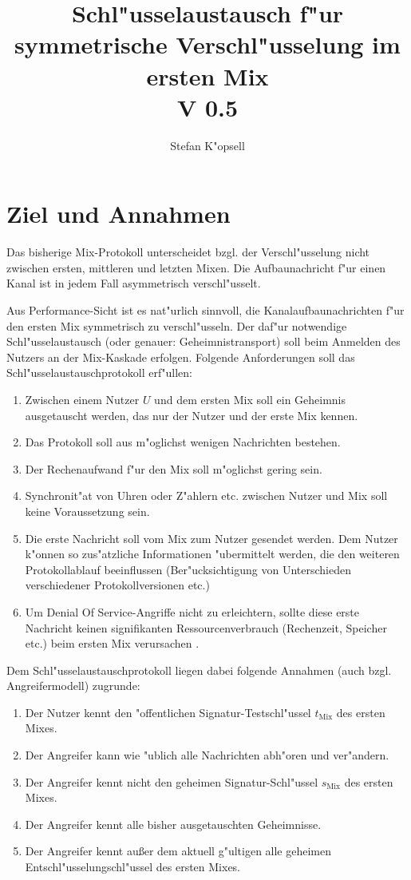 \documentclass[a4paper,german]{article}
\begin{document}
\title{Schl"usselaustausch f"ur symmetrische Verschl"usselung im ersten Mix\\V 0.5}
\author{Stefan K"opsell}
\maketitle
\section{Ziel und Annahmen}
Das bisherige Mix-Protokoll unterscheidet bzgl. der Verschl"usselung nicht zwischen ersten, mittleren und letzten Mixen. Die Aufbaunachricht
f"ur einen Kanal ist in jedem Fall asymmetrisch verschl"usselt.

Aus Performance-Sicht ist es nat"urlich sinnvoll, die Kanalaufbaunachrichten 
f"ur den ersten Mix symmetrisch zu verschl"usseln. Der daf"ur notwendige Schl"ussel\-austausch (oder genauer: Geheimnistransport) soll beim Anmelden des Nutzers an der Mix-Kaskade erfolgen.
Folgende Anforderungen soll das Schl"ussel\-austauschprotokoll erf"ullen:
\begin{enumerate}
\item Zwischen einem Nutzer $U$ und dem ersten Mix soll ein Geheimnis ausgetauscht werden, das nur der Nutzer und der erste
Mix kennen.
\item Das Protokoll soll aus m"oglichst wenigen Nachrichten bestehen.
\item Der Rechenaufwand f"ur den Mix soll m"oglichst gering sein.
\item Synchronit"at von Uhren oder Z"ahlern etc. zwischen Nutzer und Mix soll keine Voraussetzung sein.
\item Die erste Nachricht soll vom Mix zum Nutzer gesendet werden. Dem Nutzer k"onnen so zus"atzliche Informationen "ubermittelt werden,
die den weiteren Protokollablauf beeinflussen (Ber"ucksichtigung von Unterschieden verschiedener Protokollversionen etc.)
\item\label{z1} Um \glqq Denial Of Service\grqq-Angriffe nicht zu erleichtern, sollte diese erste Nachricht keinen signifikanten Ressourcenverbrauch 
(Rechenzeit, Speicher etc.) beim ersten Mix verursachen .
\end{enumerate}

\noindent
Dem Schl"usselaustauschprotokoll liegen dabei folgende Annahmen (auch bzgl. Angreifermodell) zugrunde:
\begin{enumerate}
\item Der Nutzer kennt den "offentlichen Signatur-Testschl"ussel $t_\text{Mix}$ des ersten Mixes.
\item Der Angreifer kann wie "ublich alle Nachrichten abh"oren und ver"andern.
\item Der Angreifer kennt nicht den geheimen Signatur-Schl"ussel $s_\text{Mix}$ des ersten Mixes.
\item Der Angreifer kennt alle bisher ausgetauschten Geheimnisse.
\item \label{a1} Der Angreifer kennt au{\ss}er dem aktuell g"ultigen alle geheimen Entschl"usselungschl"ussel des ersten Mixes.
\end{enumerate}
\end{document}
